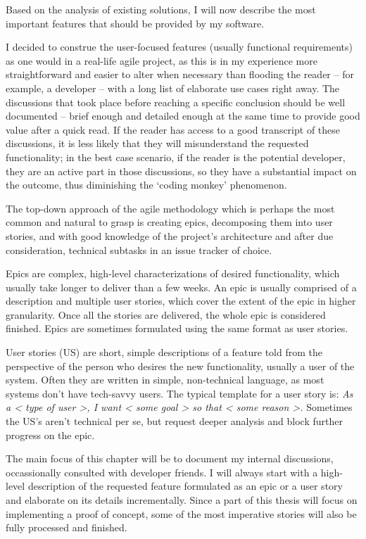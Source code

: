 \linebreak
Based on the analysis of existing solutions, I will now describe the most important features that should be provided by my software.

I decided to construe the user-focused features (usually functional requirements) as one would in a real-life agile project, as this is in my experience more straightforward and easier to alter when necessary than flooding the reader -- for example, a developer -- with a long list of elaborate use cases right away.
The discussions that took place before reaching a specific conclusion should be well documented -- brief enough and detailed enough at the same time to provide good value after a quick read.
If the reader has access to a good transcript of these discussions, it is less likely that they will misunderstand the requested functionality;
in the best case scenario, if the reader is the potential developer, they are an active part in those discussions, so they have a substantial impact on the outcome, thus diminishing the `coding monkey' phenomenon.

The top-down approach of the agile methodology which is perhaps the most common and natural to grasp is creating epics, decomposing them into user stories, and with good knowledge of the project's architecture and after due consideration, technical subtasks in an issue tracker of choice.

Epics are complex, high-level characterizations of desired functionality, which usually take longer to deliver than a few weeks.
An epic is usually comprised of a description and multiple user stories, which cover the extent of the epic in higher granularity.
Once all the stories are delivered, the whole epic is considered finished.
Epics are sometimes formulated using the same format as user stories.

User stories (US) are short, simple descriptions of a feature told from the perspective of the person who desires the new functionality, usually a user of the system.\cite{user-story-definition}
Often they are written in simple, non-technical language, as most systems don't have tech-savvy users.
The typical template for a user story is:
\textit{As a < type of user >, I want < some goal > so that < some reason >.}\cite{user-story-definition}
Sometimes the US's aren't technical per se, but request deeper analysis and block further progress on the epic.

The main focus of this chapter will be to document my internal discussions, occassionally consulted with developer friends. 
I will always start with a high-level description of the requested feature formulated as an epic or a user story and elaborate on its details incrementally.
Since a part of this thesis will focus on implementing a proof of concept, some of the most imperative stories will also be fully processed and finished.

